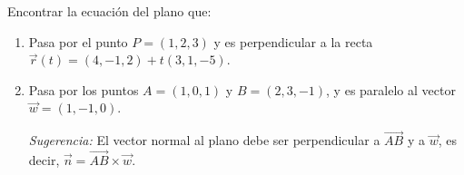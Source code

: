 Encontrar la ecuación del plano que:
\begin{enumerate}
    \item Pasa por el punto $P = (1, 2, 3)$ y es perpendicular a la recta $\vec{r}(t) = (4, -1, 2) + t(3, 1, -5)$.
    \item Pasa por los puntos $A = (1, 0, 1)$ y $B = (2, 3, -1)$, y es paralelo al vector $\vec{w} = (1, -1, 0)$.

    \textit{Sugerencia:} El vector normal al plano debe ser perpendicular a $\overrightarrow{AB}$ y a $\vec{w}$, es decir, $\vec{n} = \overrightarrow{AB} \times \vec{w}$.
\end{enumerate}